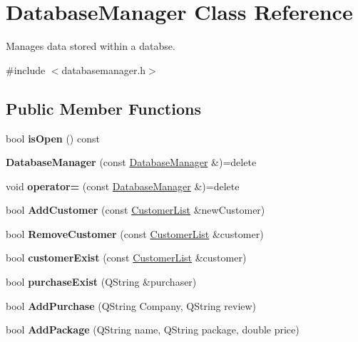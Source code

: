 \hypertarget{class_database_manager}{}\section{Database\+Manager Class Reference}
\label{class_database_manager}


Manages data stored within a databse.  




{\ttfamily \#include $<$databasemanager.\+h$>$}

\subsection*{Public Member Functions}
\begin{DoxyCompactItemize}
\item 
\mbox{\label{class_database_manager_af1c0598acf843b8e970053f17fc845f1}} 
bool {\bfseries is\+Open} () const
\item 
\mbox{\label{class_database_manager_aefa3d6eae7782904f5d758462b573b1e}} 
{\bfseries Database\+Manager} (const \mbox{\hyperlink{class_database_manager}{Database\+Manager}} \&)=delete
\item 
\mbox{\label{class_database_manager_acf8defd44bb315a62c6ef9ed10ea52c0}} 
void {\bfseries operator=} (const \mbox{\hyperlink{class_database_manager}{Database\+Manager}} \&)=delete
\item 
\mbox{\label{class_database_manager_a0355bb13d0608acf18773a6321ed2765}} 
bool {\bfseries Add\+Customer} (const \mbox{\hyperlink{class_customer_list}{Customer\+List}} \&new\+Customer)
\item 
\mbox{\label{class_database_manager_a76c778c9089b97504ea517a575bb95c7}} 
bool {\bfseries Remove\+Customer} (const \mbox{\hyperlink{class_customer_list}{Customer\+List}} \&customer)
\item 
\mbox{\label{class_database_manager_a7e5b964348b1b4b83a20880443a6d714}} 
bool {\bfseries customer\+Exist} (const \mbox{\hyperlink{class_customer_list}{Customer\+List}} \&customer)
\item 
\mbox{\label{class_database_manager_a5da7ab3f2b017bb9b2482dc8757cf487}} 
bool {\bfseries purchase\+Exist} (Q\+String \&purchaser)
\item 
\mbox{\label{class_database_manager_a8c125d96cdb57761e391849c0e3de35d}} 
bool {\bfseries Add\+Purchase} (Q\+String Company, Q\+String review)
\item 
\mbox{\label{class_database_manager_ad25114d420edce2c5e755594b5da6949}} 
bool {\bfseries Add\+Package} (Q\+String name, Q\+String package, double price)
\end{DoxyCompactItemize}
